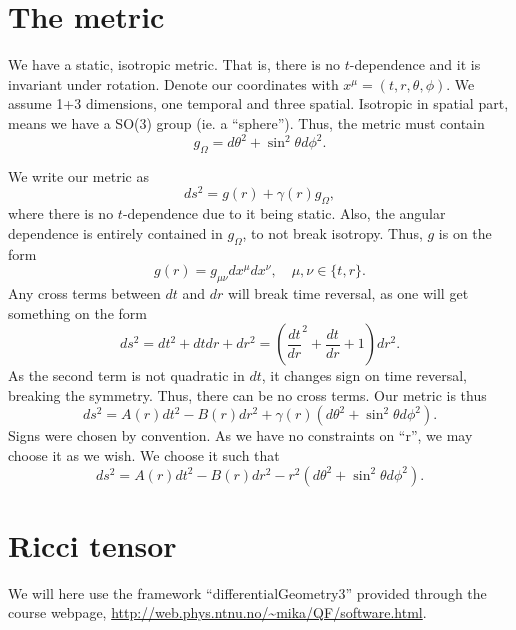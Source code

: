 \documentclass{article}
\begin{document}
\section{The metric}
We have a static, isotropic metric.
That is, there is no $t$-dependence and it is invariant under rotation.
Denote our coordinates with $x^\mu = (t, r, \theta, \phi)$.
We assume 1+3 dimensions, one temporal and three spatial.
Isotropic in spatial part, means we have a SO(3) group (ie. a ``sphere'').
Thus, the metric must contain
$$
g_\Omega = d\theta^2 + \sin^2\theta d\phi^2.
$$

We write our metric as
$$
ds^2 = g(r) + \gamma(r) g_\Omega,
$$
where there is no $t$-dependence due to it being static.
Also, the angular dependence is entirely contained in $g_\Omega$, to not break isotropy.
Thus, $g$ is on the form
$$
g(r) = g_{\mu \nu} dx^\mu dx^\nu, \quad \mu, \nu \in \{t, r\}.
$$
Any cross terms between $dt$ and $dr$ will break time reversal, as one will get something on the form
$$
ds^2 = dt^2 + dt dr + dr^2 = (\frac{dt}{dr}^2 + \frac{dt}{dr} + 1) dr^2.
$$
As the second term is not quadratic in $dt$, it changes sign on time reversal,  breaking the symmetry.
Thus, there can be no cross terms.
Our metric is thus
$$
ds^2 = A(r) dt^2 - B(r) dr^2 + \gamma(r) (d\theta^2 + \sin^2\theta d\phi^2).
$$
Signs were chosen by convention.
As we have no constraints on ``r'', we may choose it as we wish. We choose it such that
$$
ds^2 = A(r) dt^2 - B(r) dr^2 - r^2 (d\theta^2 + \sin^2\theta d\phi^2).
$$

\section{Ricci tensor}
We will here use the framework ``differentialGeometry3'' provided through the course webpage, \url{http://web.phys.ntnu.no/~mika/QF/software.html}.
\end{document}

